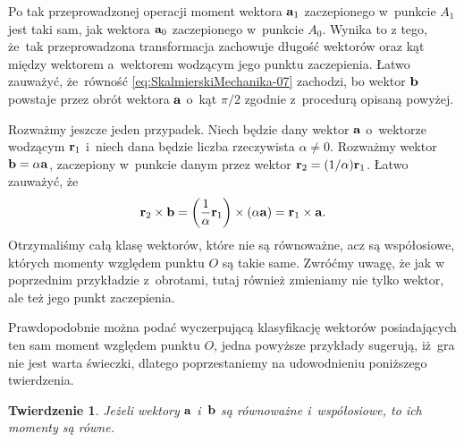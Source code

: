 \documentclass[a4paper,11pt]{article}
\numberwithin{equation}{section}
\newtheorem{theorem}{Twierdzenie}
\begin{document}
Po tak przeprowadzonej operacji moment wektora $\mathbf{a}_{ 1 }$
zaczepionego w~punkcie $A_{ 1 }$ jest taki sam, jak wektora $\mathbf{a}_{ 0 }$
zaczepionego w~punkcie $A_{ 0 }$. Wynika to z tego, że~tak przeprowadzona
transformacja zachowuje długość wektorów oraz kąt między wektorem
a~wektorem wodzącym jego punktu zaczepienia. Łatwo zauważyć, że~równość
\eqref{eq:SkalmierskiMechanika-07} zachodzi, bo wektor $\mathbf{b}$ powstaje
przez obrót wektora $\mathbf{a}$ o~kąt $\pi / 2$ zgodnie z~procedurą opisaną
powyżej.

Rozważmy jeszcze jeden przypadek. Niech będzie dany wektor $\mathbf{a}$
o~wektorze wodzącym $\mathbf{r}_{ 1 }$ i~niech dana będzie liczba rzeczywista
$\alpha \neq 0$. Rozważmy wektor $\mathbf{b} = \alpha \mathbf{a}$, zaczepiony w~punkcie
danym przez wektor $\mathbf{r}_{ 2 } = ( 1 / \alpha ) \mathbf{r}_{ 1 }$. Łatwo
zauważyć, że
\begin{equation}
  \label{eq:SkalmierskiMechanika-08}
  \mathbf{r}_{ 2 } \times \mathbf{b} =
  \left( \frac{ 1 }{ \alpha } \mathbf{r}_{ 1 } \right) \times ( \alpha \mathbf{a} ) =
  \mathbf{r}_{ 1 } \times \mathbf{a}.
\end{equation}
Otrzymaliśmy całą klasę wektorów, które nie są równoważne, acz są
współosiowe, których momenty względem punktu $O$ są takie same. Zwróćmy
uwagę, że jak w poprzednim przykładzie z~obrotami, tutaj również zmieniamy
nie tylko wektor, ale też jego punkt zaczepienia.

Prawdopodobnie można podać wyczerpującą klasyfikację wektorów posiadających
ten sam moment względem punktu $O$, jedna powyższe przykłady sugerują,
iż~gra nie jest warta świeczki, dlatego poprzestaniemy na udowodnieniu
poniższego twierdzenia.





\begin{theorem}

  Jeżeli wektory $\mathbf{a}$ i~$\mathbf{b}$ są równoważne i~współosiowe, to
  ich momenty są równe.

\end{theorem}
\end{document}

